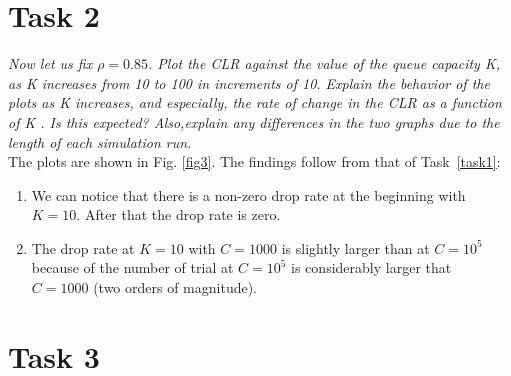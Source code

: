 \documentclass[10pt]{article}
\newcommand{\tion}[1]{Task~\ref{#1}}
\begin{document}
\section{Task 2}
\label{task2}



\textit{Now let us fix $\rho = 0.85$. Plot the CLR against the value of the queue capacity K, as K increases from 10 to 100 in increments of 10. Explain the behavior of the plots as K increases, and especially, the rate of change in the CLR as a function of K . Is this expected? Also,explain any differences in the two graphs due to the length of each simulation run.} \\
The plots are shown in Fig. \ref{fig3}. The findings follow from that of \tion{task1}: 
\begin{enumerate}
 \item We can notice that there is a non-zero drop rate at the beginning with $K=10$. After that the drop rate is zero.
 \item The drop rate at $K=10$ with $C=1000$ is slightly larger than at $C=10^5$ because of the number of trial at $C=10^5$ is considerably larger that $C=1000$ (two orders of magnitude).
\end{enumerate}

\section{Task 3}
\label{task3}

\end{document}
